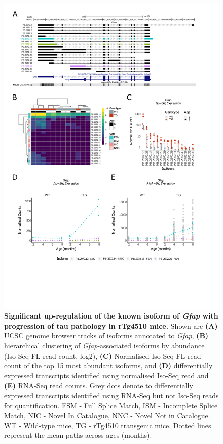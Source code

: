 \begin{figure}[!htp]
	\centering
	\includegraphics[page=1,trim={0.5cm 4.8cm 2cm 1cm}, scale = 0.85]{Figures/Ch5_DiffPlots.pdf}
	\captionsetup{width=0.95\textwidth}
	\caption[Differential \textit{Gfap} transcript expression in rTg4510 mice]%
	{\textbf{Significant up-regulation of the known isoform of \textit{Gfap} with progression of tau pathology in rTg4510 mice.} Shown are \textbf{(A)} UCSC genome browser tracks of isoforms annotated to \textit{Gfap}, \textbf{(B)} hierarchical clustering of \textit{Gfap}-associated isoforms by abundance (Iso-Seq FL read count, log2), \textbf{(C)} Normalised Iso-Seq FL read count of the top 15 most abundant isoforms, and \textbf{(D)} differentially expressed transcripts identified using normalised Iso-Seq read and \textbf{(E)} RNA-Seq read counts. Grey dots denote to differentially expressed transcripts identified using RNA-Seq but not Iso-Seq reads for quantification. FSM - Full Splice Match, ISM - Incomplete Splice Match, NIC - Novel In Catalogue, NNC - Novel Not in Catalogue. WT - Wild-type mice, TG - rTg4510 transgenic mice. Dotted lines represent the mean paths across ages (months).} 
	\label{fig:DEI_gfap}
\end{figure}

